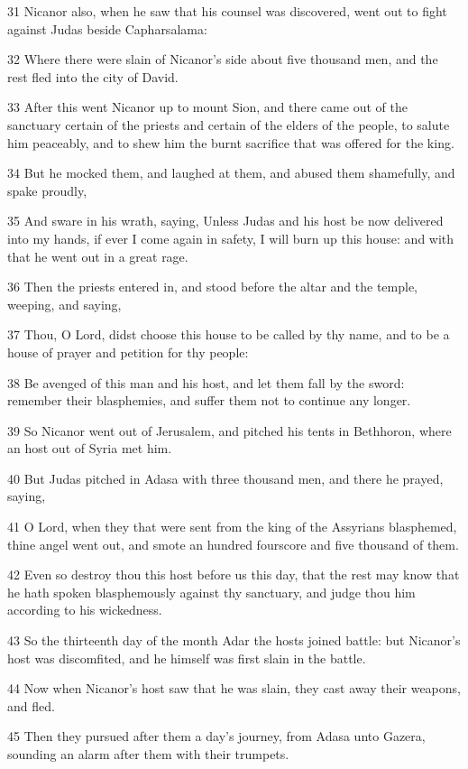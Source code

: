 \par 31 Nicanor also, when he saw that his counsel was discovered, went out to fight against Judas beside Capharsalama:
\par 32 Where there were slain of Nicanor's side about five thousand men, and the rest fled into the city of David.
\par 33 After this went Nicanor up to mount Sion, and there came out of the sanctuary certain of the priests and certain of the elders of the people, to salute him peaceably, and to shew him the burnt sacrifice that was offered for the king.
\par 34 But he mocked them, and laughed at them, and abused them shamefully, and spake proudly,
\par 35 And sware in his wrath, saying, Unless Judas and his host be now delivered into my hands, if ever I come again in safety, I will burn up this house: and with that he went out in a great rage.
\par 36 Then the priests entered in, and stood before the altar and the temple, weeping, and saying,
\par 37 Thou, O Lord, didst choose this house to be called by thy name, and to be a house of prayer and petition for thy people:
\par 38 Be avenged of this man and his host, and let them fall by the sword: remember their blasphemies, and suffer them not to continue any longer.
\par 39 So Nicanor went out of Jerusalem, and pitched his tents in Bethhoron, where an host out of Syria met him.
\par 40 But Judas pitched in Adasa with three thousand men, and there he prayed, saying,
\par 41 O Lord, when they that were sent from the king of the Assyrians blasphemed, thine angel went out, and smote an hundred fourscore and five thousand of them.
\par 42 Even so destroy thou this host before us this day, that the rest may know that he hath spoken blasphemously against thy sanctuary, and judge thou him according to his wickedness.
\par 43 So the thirteenth day of the month Adar the hosts joined battle: but Nicanor's host was discomfited, and he himself was first slain in the battle.
\par 44 Now when Nicanor's host saw that he was slain, they cast away their weapons, and fled.
\par 45 Then they pursued after them a day's journey, from Adasa unto Gazera, sounding an alarm after them with their trumpets.
